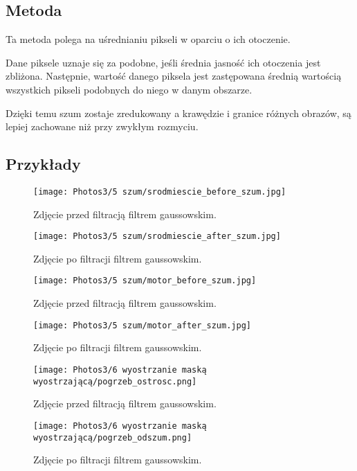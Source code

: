 \documentclass[]{mwart}
\begin{document}
\subsection{Metoda}
Ta metoda polega na uśrednianiu pikseli w oparciu o ich otoczenie.

Dane piksele uznaje się za podobne, jeśli średnia jasność ich otoczenia
jest zbliżona. Następnie, wartość danego piksela jest zastępowana
średnią wartością wszystkich pikseli podobnych do niego w danym obszarze.

Dzięki temu szum zostaje zredukowany a krawędzie i granice różnych obrazów,
są lepiej zachowane niż przy zwykłym rozmyciu.

\subsection{Przykłady}
\begin{figure}[H]
    \centering
    \texttt{[image: Photos3/5 szum/srodmiescie\_before\_szum.jpg]}
    \caption{Zdjęcie przed filtracją filtrem gaussowskim.}
\end{figure}
\begin{figure}[H]
    \centering
    \texttt{[image: Photos3/5 szum/srodmiescie\_after\_szum.jpg]}
    \caption{Zdjęcie po filtracji filtrem gaussowskim.}
\end{figure}

\begin{figure}[H]
    \centering
    \texttt{[image: Photos3/5 szum/motor\_before\_szum.jpg]}
    \caption{Zdjęcie przed filtracją filtrem gaussowskim.}
\end{figure}
\begin{figure}[H]
    \centering
    \texttt{[image: Photos3/5 szum/motor\_after\_szum.jpg]}
    \caption{Zdjęcie po filtracji filtrem gaussowskim.}
\end{figure}

\begin{figure}[H]
    \centering
    \texttt{[image: Photos3/6 wyostrzanie maską wyostrzającą/pogrzeb\_ostrosc.png]}
    \caption{Zdjęcie przed filtracją filtrem gaussowskim.}
\end{figure}
\begin{figure}[H]
    \centering
    \texttt{[image: Photos3/6 wyostrzanie maską wyostrzającą/pogrzeb\_odszum.png]}
    \caption{Zdjęcie po filtracji filtrem gaussowskim.}
\end{figure}
\end{document}
